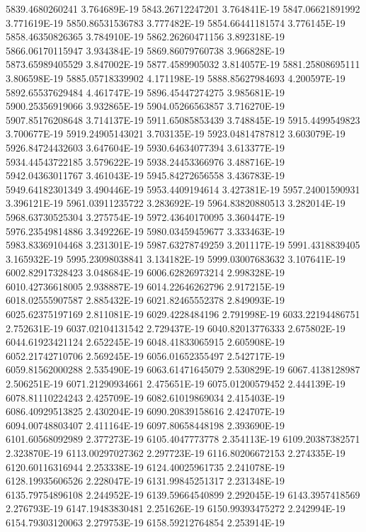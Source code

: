 5839.4680260241  3.764689E-19
5843.26712247201  3.764841E-19
5847.06621891992  3.771619E-19
5850.86531536783  3.777482E-19
5854.66441181574  3.776145E-19
5858.46350826365  3.784910E-19
5862.26260471156  3.892318E-19
5866.06170115947  3.934384E-19
5869.86079760738  3.966828E-19
5873.65989405529  3.847002E-19
5877.4589905032  3.814057E-19
5881.25808695111  3.806598E-19
5885.05718339902  4.171198E-19
5888.85627984693  4.200597E-19
5892.65537629484  4.461747E-19
5896.45447274275  3.985681E-19
5900.25356919066  3.932865E-19
5904.05266563857  3.716270E-19
5907.85176208648  3.714137E-19
5911.65085853439  3.748845E-19
5915.4499549823  3.700677E-19
5919.24905143021  3.703135E-19
5923.04814787812  3.603079E-19
5926.84724432603  3.647604E-19
5930.64634077394  3.613377E-19
5934.44543722185  3.579622E-19
5938.24453366976  3.488716E-19
5942.04363011767  3.461043E-19
5945.84272656558  3.436783E-19
5949.64182301349  3.490446E-19
5953.4409194614  3.427381E-19
5957.24001590931  3.396121E-19
5961.03911235722  3.283692E-19
5964.83820880513  3.282014E-19
5968.63730525304  3.275754E-19
5972.43640170095  3.360447E-19
5976.23549814886  3.349226E-19
5980.03459459677  3.333463E-19
5983.83369104468  3.231301E-19
5987.63278749259  3.201117E-19
5991.4318839405  3.165932E-19
5995.23098038841  3.134182E-19
5999.03007683632  3.107641E-19
6002.82917328423  3.048684E-19
6006.62826973214  2.998328E-19
6010.42736618005  2.938887E-19
6014.22646262796  2.917215E-19
6018.02555907587  2.885432E-19
6021.82465552378  2.849093E-19
6025.62375197169  2.811081E-19
6029.4228484196  2.791998E-19
6033.22194486751  2.752631E-19
6037.02104131542  2.729437E-19
6040.82013776333  2.675802E-19
6044.61923421124  2.652245E-19
6048.41833065915  2.605908E-19
6052.21742710706  2.569245E-19
6056.01652355497  2.542717E-19
6059.81562000288  2.535490E-19
6063.61471645079  2.530829E-19
6067.4138128987  2.506251E-19
6071.21290934661  2.475651E-19
6075.01200579452  2.444139E-19
6078.81110224243  2.425709E-19
6082.61019869034  2.415403E-19
6086.40929513825  2.430204E-19
6090.20839158616  2.424707E-19
6094.00748803407  2.411164E-19
6097.80658448198  2.393690E-19
6101.60568092989  2.377273E-19
6105.4047773778  2.354113E-19
6109.20387382571  2.323870E-19
6113.00297027362  2.297723E-19
6116.80206672153  2.274335E-19
6120.60116316944  2.253338E-19
6124.40025961735  2.241078E-19
6128.19935606526  2.228047E-19
6131.99845251317  2.231348E-19
6135.79754896108  2.244952E-19
6139.59664540899  2.292045E-19
6143.3957418569  2.276793E-19
6147.19483830481  2.251626E-19
6150.99393475272  2.242994E-19
6154.79303120063  2.279753E-19
6158.59212764854  2.253914E-19
